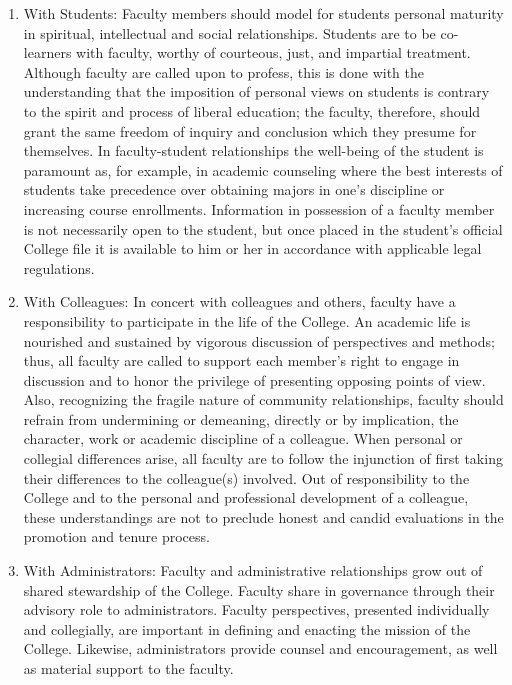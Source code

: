 \documentclass[letterpaper, 11pt]{article}
\begin{document}
				\begin{enumerate}[label=\alph*)]
					\item{With Students:  Faculty members should model for students personal maturity in spiritual, intellectual and social relationships.  Students are to be co-learners with faculty, worthy of courteous, just, and impartial treatment.  Although faculty are called upon to profess, this is done with the understanding that the imposition of personal views on students is contrary to the spirit and process of liberal education; the faculty, therefore, should grant the same freedom of inquiry and conclusion which they presume for themselves.  In faculty-student relationships the well-being of the student is paramount as, for example, in academic counseling where the best interests of students take precedence over obtaining majors in one's discipline or increasing course enrollments.  Information in possession of a faculty member is not necessarily open to the student, but once placed in the student's official College file it is available to him or her in accordance with applicable legal regulations.}
					\item{With Colleagues:  In concert with colleagues and others, faculty have a responsibility to participate in the life of the College.  An academic life is nourished and sustained by vigorous discussion of perspectives and methods; thus, all faculty are called to support each member's right to engage in discussion and to honor the privilege of presenting opposing points of view.  Also, recognizing the fragile nature of community relationships, faculty should refrain from undermining or demeaning, directly or by implication, the character, work or academic discipline of a colleague. When personal or collegial differences arise, all faculty are to follow the injunction of first taking their differences to the colleague(s) involved.  Out of responsibility to the College and to the personal and professional development of a colleague, these understandings are not to preclude honest and candid evaluations in the promotion and tenure process.}
					\item{With Administrators:  Faculty and administrative relationships grow out of shared stewardship of the College.  Faculty share in governance through their advisory role to administrators.  Faculty perspectives, presented individually and collegially, are important in defining and enacting the mission of the College.  Likewise, administrators provide counsel and encouragement, as well as material support to the faculty.}

\end{enumerate}
\end{document}
